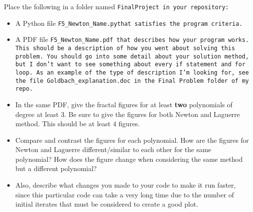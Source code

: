 \documentclass{article}
\newcommand\foldername{\tt{FinalProject} }
\newcommand\filename{\tt{F5\_Newton\_Name.py}\;\;}
\begin{document}
	
	Place the following in a folder named \foldername in your repository:
	\begin{itemize}
		\item A Python file \filename  that satisfies the program criteria.
		\item A PDF file \tt{F5\_Newton\_Name.pdf} that describes how your program works.  This should be a description of how you went about solving this problem.  You should go into some detail about your solution method, but I don't want to see something about every \tt{if} statement and \tt{for} loop.  As an example of the type of description I'm looking for, see the file \tt{Goldbach\_explanation.doc} in the \tt{Final Problem} folder of my repo.
		\item In the same PDF, give the fractal figures for at least \textbf{two} polynomials of degree at least 3.  Be sure to give the figures for both Newton and Laguerre method.  This should be at least 4 figures.
		\item Compare and contrast the figures for each polynomial.  How are the figures for Newton and Laguerre different/similar to each other for the same polynomial?  How does the figure change when considering the same method but a different polynomial?
		\item Also, describe what changes you made to your code to make it run faster, since this particular code can take a very long time due to the number of initial iterates that must be considered to create a good plot.
	\end{itemize}

	
\end{document}
